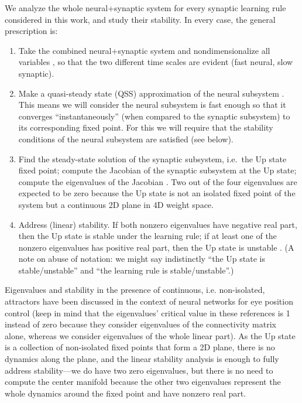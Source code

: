 \documentclass[twocolumn]{article}
\begin{document}
We analyze the whole neural+synaptic system for every synaptic learning rule considered in this work, and study their stability. In every case, the general prescription is:
\begin{enumerate}
\item Take the combined neural+synaptic system and nondimensionalize all variables \cite[see Sections 1.2 and 1.4 of Ref.\ ][]{Keener1998}\cite[see Section 3.5 of Ref.\ ][]{Strogatz2018}, so that the two different time scales are evident (fast neural, slow synaptic).
\item Make a quasi-steady state (QSS) approximation of the neural subsystem \cite{Keener1998,Strogatz2018}. This means we will consider the neural subsystem is fast enough so that it converges ``instantaneously'' (when compared to the synaptic subsystem) to its corresponding fixed point. 
For this we will require that the stability conditions of the neural subsystem are satisfied (see below).
\item Find the steady-state solution of the synaptic subsystem, i.e.\ the Up state fixed point; compute the Jacobian of the synaptic subsystem at the Up state; compute the eigenvalues of the Jacobian \cite{Strogatz2018,Wiggins1996}. Two out of the four eigenvalues are expected to be zero because the Up state is not an isolated fixed point of the system but a continuous 2D plane in 4D weight space.
\item Address (linear) stability. If both nonzero eigenvalues have negative real part, then the Up state is stable under the learning rule; if at least one of the nonzero eigenvalues has positive real part, then the Up state is unstable \cite{Strogatz2018,Wiggins1996}. (A note on abuse of notation: we might say indistinctly ``the Up state is stable/unstable'' and ``the learning rule is stable/unstable''.)
\end{enumerate}

Eigenvalues and stability in the presence of continuous, i.e. non-isolated, attractors have been discussed in the context of neural networks for eye position control \cite{Seung1996,Seung1998} (keep in mind that the eigenvalues' critical value in these references is 1 instead of zero because they consider eigenvalues of the connectivity matrix alone, whereas we consider eigenvalues of the whole linear part). As the Up state is a collection of non-isolated fixed points that form a 2D plane, there is no dynamics along the plane, and the linear stability analysis is enough to fully address stability---we do have two zero eigenvalues, but there is no need to compute the center manifold \cite{Wiggins1996} because the other two eigenvalues represent the whole dynamics around the fixed point and have nonzero real part.
\end{document}
